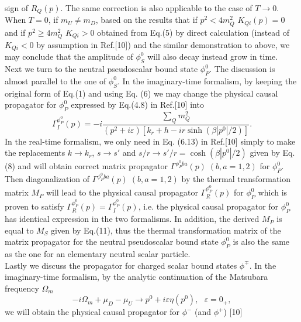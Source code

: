 \documentclass[twocolumn,prd,showpacs,a4paper]{revtex4}
\begin{document}
sign of $R_Q(p)$. The same correction is also applicable to the case of $T\to 0$.
When $T=0$, if $m_U\neq m_D$, based on the results that if $p^2<4m_Q^2$ $K_{Qi}(p)=0$ 
and if $p^2\geq 4m_Q^2$ $K_{Qi}>0$ obtained from Eq.(5) by direct calculation 
(instead of $K_{Qi}<0$ by assumption in Ref.[10]) and the similar demonstration to 
above, we may conclude that the amplitude of $\phi_S^0$ will also decay instead grow 
in time. \\
\indent Next we turn to the neutral pseudoscalar bound state $\phi_P^0$. The 
discussion is almost parallel to the one of $\phi_S^0$. In the imaginary-time 
formalism, by keeping the original form of Eq.(1) and using Eq. (6) we may change 
the physical causal propagator for $\phi_P^0$ expressed by Eq.(4.8) in Ref.[10] into  
\begin{equation}
\Gamma_I^{\phi_P^0}(p)
 =-i\frac{\sum_{Q}m_Q^2}{(p^2+i\varepsilon) [k_r+h-ir\sinh(\beta|p^0|/2)]}.
\end{equation}%
In the real-time formalism, we only need in Eq. (6.13) in Ref.[10] simply 
to make the replacements $k\to k_r$, $s\to s'$ and $s/r\to s'/r=\cosh(\beta|p^0|/2)$ 
given by Eq.(8) and will obtain correct matrix propagator $\Gamma^{\phi_P^0ba}(p)\; 
(b,a=1,2)$ for $\phi_P^0$. Then diagonalization of $\Gamma^{\phi_P^0ba}(p)\; 
(b,a=1,2)$ by the thermal transformation matrix $M_P$ will lead to the physical causal 
propagator $\Gamma_R^{\phi_P^0}(p)$ for $\phi_P^0$ which is proven to satisfy 
$\Gamma_R^{\phi_P^0}(p)= \Gamma_I^{\phi_P^0}(p)$, i.e. the physical causal 
propagator for $\phi_P^0$ has identical expression in the two formalisms. In 
addition, the derived $M_P$ is equal to $M_S$ given by Eq.(11), thus the thermal 
transformation matrix of the matrix propagator for the neutral pseudoscalar bound 
state $\phi_P^0$ is also the same as the one for an elementary neutral scalar 
particle.\\
\indent Lastly we discuss the propagator for charged scalar bound states $\phi^{\mp}$.  In the imaginary-time formalism, by the analytic continuation of the Matsubara 
frequency 
$\Omega_m$
\begin{equation}
-i\Omega_m +\mu_D-\mu_U\longrightarrow p^0 +i\varepsilon \eta(p^0), \ \ \
                     \varepsilon =0_+,
\end{equation}%
we will obtain the physical causal propagator for $\phi^-$ (and $\phi^+$) [10]
\end{document}
